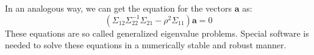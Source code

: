 In an analogous way, we can get the equation for the vectors $\mathbf{a}$ as:
\begin{equation} \label{eq:gen_eig_a}
    (\Sigma_{12} \Sigma_{22}^{-1} \Sigma_{21} - \rho^2 \Sigma_{11})\mathbf{a} = 0
\end{equation}
These equations are so called generalized eigenvalue problems. Special software is needed to solve these equations in a numerically stable and robust manner.



